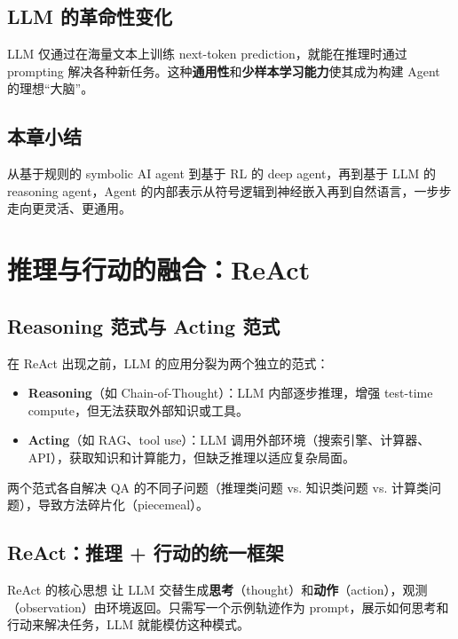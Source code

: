 \documentclass[a4paper]{article}
\begin{document}
\subsection{LLM 的革命性变化}

LLM 仅通过在海量文本上训练 next-token prediction，就能在推理时通过 prompting 解决各种新任务。这种\textbf{通用性}和\textbf{少样本学习能力}使其成为构建 Agent 的理想``大脑''。

\subsection{本章小结}

从基于规则的 symbolic AI agent 到基于 RL 的 deep agent，再到基于 LLM 的 reasoning agent，Agent 的内部表示从符号逻辑到神经嵌入再到自然语言，一步步走向更灵活、更通用。

\section{推理与行动的融合：ReAct}

\subsection{Reasoning 范式与 Acting 范式}

在 ReAct 出现之前，LLM 的应用分裂为两个独立的范式：

\begin{itemize}
    \item \textbf{Reasoning}（如 Chain-of-Thought）：LLM 内部逐步推理，增强 test-time compute，但无法获取外部知识或工具。
    \item \textbf{Acting}（如 RAG、tool use）：LLM 调用外部环境（搜索引擎、计算器、API），获取知识和计算能力，但缺乏推理以适应复杂局面。
\end{itemize}

两个范式各自解决 QA 的不同子问题（推理类问题 vs. 知识类问题 vs. 计算类问题），导致方法碎片化（piecemeal）。

\subsection{ReAct：推理 + 行动的统一框架}

\begin{importantbox}{ReAct 的核心思想}
让 LLM 交替生成\textbf{思考}（thought）和\textbf{动作}（action），观测（observation）由环境返回。只需写一个示例轨迹作为 prompt，展示如何思考和行动来解决任务，LLM 就能模仿这种模式。
\end{importantbox}
\end{document}
